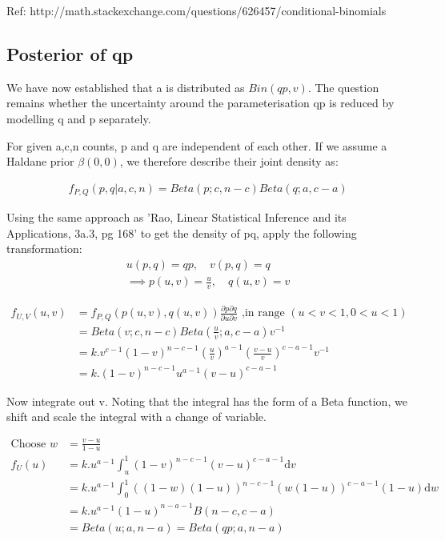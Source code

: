 \documentclass[11pt,a4,singlespacing,titlepagenumber=on]{scrreprt}
\numberwithin{equation}{chapter} %
\theoremstyle{remark}
\begin{document}
Ref: http://math.stackexchange.com/questions/626457/conditional-binomials

\subsection{Posterior of qp}

We have now established that a is distributed as $Bin(qp,v)$. The question remains whether the uncertainty around the parameterisation qp is reduced by modelling q and p separately.

For given a,c,n counts, p and q are independent of each other. If we assume a Haldane prior $\beta(0,0)$, we therefore describe their joint density as:

\begin{align}
 f_{P,Q}(p,q|a,c,n) = Beta(p;c,n-c) Beta(q;a,c-a)
\end{align}

Using the same approach as 'Rao, Linear Statistical Inference and its Applications, 3a.3, pg 168' to get the density of pq, apply the following transformation:
\begin{align}
 u(p,q) = qp, \quad v(p,q) = q  \\
 \implies p(u,v) = \frac{u}{v}, \quad q(u,v) = v
\end{align}

\begin{align}
 f_{U,V}(u,v) &= f_{P,Q}(p(u,v),q(u,v)) 
		\frac{\partial p \partial q}{\partial u \partial v} 
		\text{ ,in range }  (u<v<1,0<u<1) \\
 &= Beta(v;c,n-c) Beta(\frac{u}{v};a,c-a) v^{-1} \\
 &= k . v^{c-1} (1-v)^{n-c-1} (\frac{u}{v})^{a-1} (\frac{v - u}{v})^{c-a-1} v^{-1} \\
 &= k . (1-v)^{n-c-1} u^{a-1} (v - u)^{c-a-1}
\end{align}

Now integrate out v. Noting that the integral has the form of a Beta function, we shift and scale the integral with a change of variable.

\begin{align}
\text{Choose }  w &= \frac{v-u}{1-u} \\
f_U(u) &= k.u^{a-1} \int_u^1 (1-v)^{n-c-1} (v - u)^{c-a-1} \mathrm{d}v \\
 &= k.u^{a-1} \int_0^1 ((1-w)(1-u))^{n-c-1} (w(1-u))^{c-a-1} (1-u) \mathrm{d}w \\
 &= k.u^{a-1} (1-u)^{n-a-1} B(n-c,c-a) \\
 &= Beta(u;a,n-a) = Beta(qp;a,n-a) 
\end{align}
\end{document}
